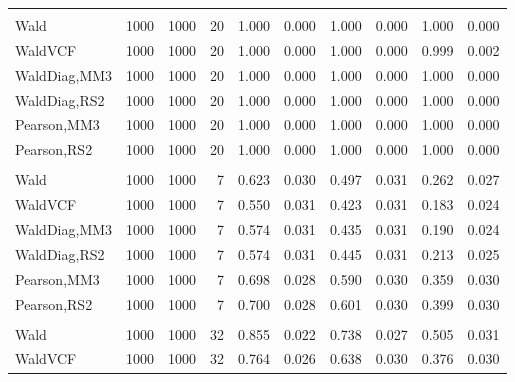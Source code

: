 \documentclass[
]{article}
\begin{document}
\begin{table}[H]
{\begin{tabular}[t]{lrrrrrrlrr}
\addlinespace[0.3em]
\multicolumn{10}{l}{\textbf{1F 15V}}\\
\hspace{1em}Wald & 1000 & 1000 & 20 & 1.000 & 0.000 & 1.000 & 0.000 & 1.000 & 0.000\\
\hspace{1em}WaldVCF & 1000 & 1000 & 20 & 1.000 & 0.000 & 1.000 & 0.000 & 0.999 & 0.002\\
\hspace{1em}WaldDiag,MM3 & 1000 & 1000 & 20 & 1.000 & 0.000 & 1.000 & 0.000 & 1.000 & 0.000\\
\hspace{1em}WaldDiag,RS2 & 1000 & 1000 & 20 & 1.000 & 0.000 & 1.000 & 0.000 & 1.000 & 0.000\\
\hspace{1em}Pearson,MM3 & 1000 & 1000 & 20 & 1.000 & 0.000 & 1.000 & 0.000 & 1.000 & 0.000\\
\hspace{1em}Pearson,RS2 & 1000 & 1000 & 20 & 1.000 & 0.000 & 1.000 & 0.000 & 1.000 & 0.000\\
\addlinespace[0.3em]
\multicolumn{10}{l}{\textbf{2F 10V}}\\
\hspace{1em}Wald & 1000 & 1000 & 7 & 0.623 & 0.030 & 0.497 & 0.031 & 0.262 & 0.027\\
\hspace{1em}WaldVCF & 1000 & 1000 & 7 & 0.550 & 0.031 & 0.423 & 0.031 & 0.183 & 0.024\\
\hspace{1em}WaldDiag,MM3 & 1000 & 1000 & 7 & 0.574 & 0.031 & 0.435 & 0.031 & 0.190 & 0.024\\
\hspace{1em}WaldDiag,RS2 & 1000 & 1000 & 7 & 0.574 & 0.031 & 0.445 & 0.031 & 0.213 & 0.025\\
\hspace{1em}Pearson,MM3 & 1000 & 1000 & 7 & 0.698 & 0.028 & 0.590 & 0.030 & 0.359 & 0.030\\
\hspace{1em}Pearson,RS2 & 1000 & 1000 & 7 & 0.700 & 0.028 & 0.601 & 0.030 & 0.399 & 0.030\\
\addlinespace[0.3em]
\multicolumn{10}{l}{\textbf{3F 15V}}\\
\hspace{1em}Wald & 1000 & 1000 & 32 & 0.855 & 0.022 & 0.738 & 0.027 & 0.505 & 0.031\\
\hspace{1em}WaldVCF & 1000 & 1000 & 32 & 0.764 & 0.026 & 0.638 & 0.030 & 0.376 & 0.030\\

\end{tabular}}
\end{table}
\end{document}
